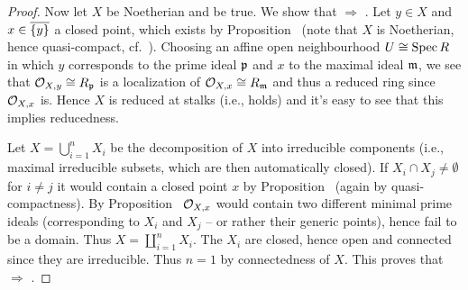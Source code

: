 \documentclass[a4paper,parskip=half,numbers=enddot, DIV=12]{scrreprt}
\begin{document}
\begin{proof}
    Now let $X$ be Noetherian and  be true. We show that  $\Rightarrow$ . Let $y\in X$ and $x\in\overline{\{y\}}$ a closed point, which exists by Proposition~ (note that $X$ is Noetherian, hence quasi-compact, cf.\ \cite[Definition~2.1.2]{alg1}). Choosing an affine open neighbourhood $U\cong \operatorname{Spec} R$ in which $y$ corresponds to the prime ideal $\mathfrak{p}$ and $x$ to the maximal ideal $\mathfrak{m}$, we see that $\mathcal{O}_{X,y}\cong R_{\mathfrak{p}}$ is a localization of $\mathcal{O}_{X,x}\cong R_{\mathfrak{m}}$ and thus a reduced ring since $\mathcal{O}_{X,x}$ is. Hence $X$ is reduced at stalks (i.e.,  holds) and it's easy to see that this implies reducedness.
    
    Let $X=\bigcup_{i=1}^nX_i$ be the decomposition of $X$ into irreducible components (i.e., maximal irreducible subsets, which are then automatically closed). If $X_i\cap X_j \neq \emptyset$ for $i\neq j$ it would contain a closed point $x$ by Proposition~ (again by quasi-compactness). By Proposition~ $\mathcal{O}_{X,x}$ would contain two different minimal prime ideals (corresponding to $X_i$ and $X_j$ -- or rather their generic points), hence fail to be a domain. Thus $X=\coprod_{i=1}^nX_i$. The $X_i$ are closed, hence open and connected since they are irreducible. Thus $n=1$ by connectedness of $X$. This proves that  $\Rightarrow$ .
\end{proof}
\end{document}
